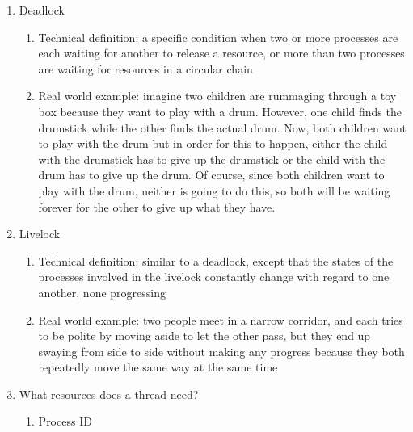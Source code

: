\documentclass [12pt, executivepaper]{article}
\begin{document}
\begin{enumerate}
\begin{enumerate}
\end{enumerate}

\item Deadlock

\begin{enumerate}

\item Technical definition: a specific condition when two or more processes are each waiting for another to release a resource, or more than two processes are waiting for resources in a circular chain

\item Real world example: imagine two children are rummaging through a toy box because they want to play with a drum. However, one child finds the drumstick while the other finds the actual drum. Now, both children want to play with the drum but in order for this to happen, either the child with the drumstick has to give up the drumstick or the child with the drum has to give up the drum. Of course, since both children want to play with the drum, neither is going to do this, so both will be waiting forever for the other to give up what they have.

\end{enumerate}

\item Livelock

\begin{enumerate}

\item Technical definition: similar to a deadlock, except that the states of the processes involved in the livelock constantly change with regard to one another, none progressing

\item Real world example: two people meet in a narrow corridor, and each tries to be polite by moving aside to let the other pass, but they end up swaying from side to side without making any progress because they both repeatedly move the same way at the same time

\end{enumerate}

\pagebreak

\vspace*{-40mm}

\item What resources does a thread need?

\begin{enumerate}

\item Process ID


\end{enumerate}
\end{enumerate}
\end{document}
